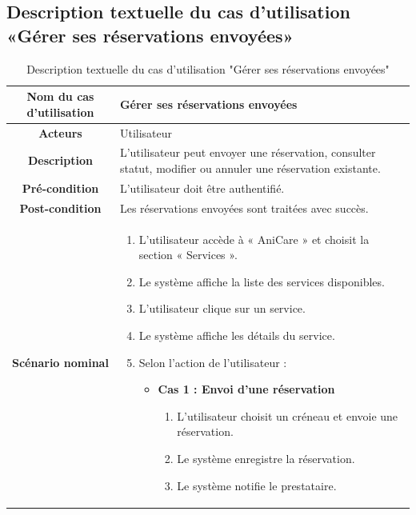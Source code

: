  \subsection{Description textuelle du cas d’utilisation «Gérer ses réservations envoyées»} 
\begin{longtable}{|c|p{11cm}|}
\caption{Description textuelle du cas d’utilisation "Gérer ses réservations envoyées"}
\label{tab:gerer_reservations_envoyees} \\
\hline
\cellcolor{coloranicare} \textbf{Nom du cas d'utilisation } & Gérer ses réservations envoyées \\
\hline
\cellcolor{coloranicare} \textbf{Acteurs} & Utilisateur \\
\hline
\cellcolor{coloranicare} \textbf{Description } & 
L’utilisateur peut envoyer une réservation, consulter  statut, modifier ou annuler une réservation existante. \\
\hline

\cellcolor{coloranicare} \textbf{Pré-condition } & L’utilisateur doit être authentifié. \\
\hline

\cellcolor{coloranicare} \textbf{Post-condition } & Les réservations envoyées sont traitées avec succès.\\
\hline

\cellcolor{coloranicare} \textbf{Scénario nominal } &
\begin{enumerate}
\item L’utilisateur accède à « AniCare » et choisit la section « Services ».
\item Le système affiche la liste des services disponibles.
\item L’utilisateur clique sur un service.
\item Le système affiche les détails du service.

\item Selon l’action de l’utilisateur :

\begin{itemize}

\item \textbf{Cas 1 : Envoi d’une réservation}
\begin{enumerate}
\item L’utilisateur choisit un créneau et envoie une réservation.
\item Le système enregistre la réservation.
\item Le système notifie le prestataire.
\end{enumerate}


\end{itemize}
\end{enumerate}
\end{longtable}
